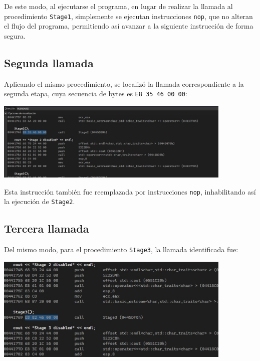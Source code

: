 \documentclass[11pt,a4paper]{article}
\begin{document}
De este modo, al ejecutarse el programa, en lugar de realizar la llamada al procedimiento \texttt{Stage1}, simplemente se ejecutan instrucciones \texttt{nop}, que no alteran el flujo del programa, permitiendo así avanzar a la siguiente instrucción de forma segura.

\vspace{2ex}

\subsection{Segunda llamada}
\noindent Aplicando el mismo procedimiento, se localizó la llamada correspondiente a la segunda etapa, cuya secuencia de bytes es \texttt{E8 35 46 00 00}:
\begin{center}
\includegraphics[width=0.85\textwidth]{4-2.png}
\end{center}

\noindent Esta instrucción también fue reemplazada por instrucciones \texttt{nop}, inhabilitando así la ejecución de \texttt{Stage2}.

\vspace{3ex}

\subsection{Tercera llamada}
\noindent Del mismo modo, para el procedimiento \texttt{Stage3}, la llamada identificada fue:
\begin{center}
\includegraphics[width=0.85\textwidth]{4-3.png}
\end{center}
\vspace{1ex}
\end{document}
